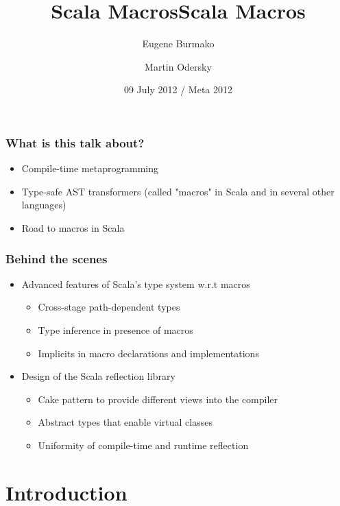 \documentclass[hyperref={bookmarks=false}]{beamer}
\title{Scala Macros}
\begin{document}
\title{Scala Macros}
\author{Eugene Burmako \and Martin Odersky}
\date{09 July 2012 / Meta 2012}
{
\begin{frame}
  \titlepage
\end{frame}
}

\begin{frame}[fragile]
\frametitle{What is this talk about?}
\begin{itemize}
\item Compile-time metaprogramming
\item Type-safe AST transformers (called "macros" in Scala and in several other languages)
\item Road to macros in Scala
\end{itemize}
\end{frame}

\begin{frame}[fragile]
\frametitle{Behind the scenes}
\begin{itemize}
\item Advanced features of Scala's type system w.r.t macros
\begin{itemize}
\item Cross-stage path-dependent types
\item Type inference in presence of macros
\item Implicits in macro declarations and implementations
\end{itemize}
\item Design of the Scala reflection library
\begin{itemize}
\item Cake pattern to provide different views into the compiler
\item Abstract types that enable virtual classes
\item Uniformity of compile-time and runtime reflection
\end{itemize}
\end{itemize}
\end{frame}

\section{Introduction}
\end{document}
